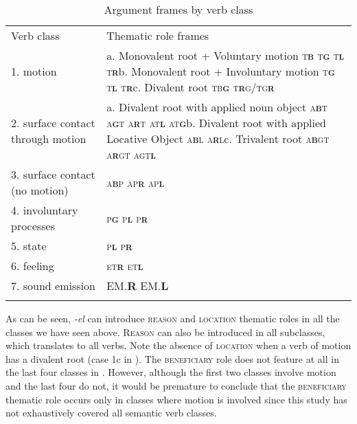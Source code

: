 \documentclass[output=paper]{langsci/langscibook}
\begin{document}
\begin{table}
\caption{Argument frames by verb class}
\label{tab:2}

\begin{tabularx}{\textwidth}{XX}
\lsptoprule
{Verb class} & {Thematic role frames}\\
{1. motion} & {a. Monovalent root + Voluntary motion} {\textsc{t}\textbf{\textsc{b}} \textsc{t}\textbf{\textsc{g}} \textsc{t}\textbf{\textsc{l}} \textsc{t}\textbf{\textsc{r}}}{b. Monovalent root + Involuntary motion} {\textsc{t}\textbf{\textsc{g}} \textsc{t}\textbf{\textsc{l}} \textsc{t}\textbf{\textsc{r}}}{c. Divalent root} {\textsc{tb}\textbf{\textsc{g}} \textsc{t}\textbf{\textsc{r}}\textsc{g/tg}\textbf{\textsc{r}} \textsc{}}\\
{2. surface contact through motion} & {a. Divalent root with applied noun object} {\textsc{a}\textbf{\textsc{b}}\textsc{t a}\textbf{\textsc{g}}\textsc{t a}\textbf{\textsc{r}}\textsc{t at}\textbf{\textsc{l}} \textsc{at}\textbf{\textsc{g}}}{b. Divalent root with applied Locative Object} {\textsc{a}\textbf{\textsc{b}}\textsc{l a}\textbf{\textsc{r}}\textsc{l}}{c. Trivalent root} {\textsc{a}\textbf{\textsc{b}}\textsc{gt a}\textbf{\textsc{r}}\textsc{gt agt}\textbf{\textsc{l}}}\\
{3. surface contact (no motion)} & {\textsc{a}\textbf{\textsc{b}}\textsc{p ap}\textbf{\textsc{r}} \textsc{ap}\textbf{\textsc{l}}}\\
{4. involuntary processes } & {\textsc{p}\textbf{\textsc{g}} \textsc{p}\textbf{\textsc{l}} \textsc{p}\textbf{\textsc{r}}}\\
{5. state} & {\textsc{p}\textbf{\textsc{l}} \textsc{p}\textbf{\textsc{r}}}\\
{6. feeling} & {\textsc{et}\textbf{\textsc{r}} \textsc{et}\textbf{\textsc{l}}}\\
{7. sound emission } & {\textsc{EM.}\textbf{\textsc{R}} \textsc{EM.}\textbf{\textsc{L}}}\\
\lspbottomrule
\end{tabularx}

\end{table}

As can be seen, \textit{-el} can introduce \textsc{reason} and \textsc{location} thematic roles in all the classes we have seen above. \textsc{Reason} can also be introduced in all subclasses, which translates to all verbs. Note the absence of \textsc{location} when a verb of motion has a divalent root (case 1c in ). The \textsc{beneficiary} role does not feature at all in the last four classes in . However, although the first two classes involve motion and the last four do not, it would be premature to conclude that the \textsc{beneficiary} thematic role occurs only in classes where motion is involved since this study has not exhaustively covered all semantic verb classes.
\end{document}
